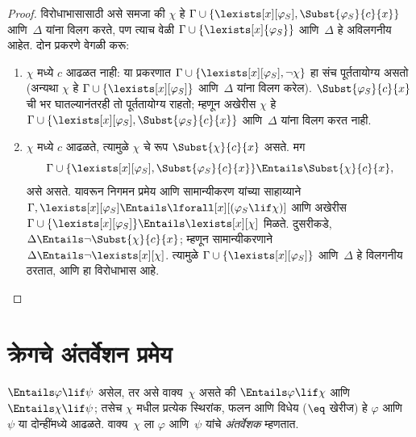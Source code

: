 \begin{proof}
विरोधाभासासाठी असे समजा की $\chi$ हे $\Gamma \cup \{ \lexists[x][\varphi_{S}],
\Subst{\varphi_{S}}{c}{x}\}$ आणि~$\Delta$ यांना विलग करते, पण त्याच वेळी
$\Gamma \cup \{\lexists[x]{\varphi_{S}} \}$ आणि~$\Delta$ हे अविलगनीय आहेत. दोन
प्रकरणे वेगळी करू:
\begin{enumerate}
\item $\chi$ मध्ये $c$ आढळत नाही: या प्रकरणात $\Gamma \cup
  \{\lexists[x][\varphi_{S}], \lnot\chi \}$ हा संच पूर्ततायोग्य असतो (अन्यथा
  $\chi$ हे $\Gamma \cup \{\lexists[x][\varphi_{S}] \}$ आणि~$\Delta$ यांना विलग
  करेल). $\Subst{\varphi_{S}}{c}{x}$ ची भर घातल्यानंतरही तो पूर्ततायोग्य राहतो;
  म्हणून अखेरीस $\chi$ हे $\Gamma \cup \{ \lexists[x][\varphi_{S}],
  \Subst{\varphi_{S}}{c}{x} \}$ आणि~$\Delta$ यांना विलग करत नाही.
\item $\chi$ मध्ये $c$ आढळते, त्यामुळे $\chi$ चे रूप
  $\Subst{\chi}{c}{x}$ असते. मग
  \[  \Gamma \cup \{ \lexists[x][\varphi_{S}], \Subst{\varphi_{S}}{c}{x}\} \Entails \Subst{\chi}{c}{x},
  \]
  असे असते. यावरून निगमन प्रमेय आणि सामान्यीकरण यांच्या साहाय्याने
  $\Gamma, \lexists[x][\varphi_{S}] \Entails \lforall[x][(\varphi_{S} \lif \chi)]$ आणि
  अखेरीस $\Gamma \cup \{ \lexists[x][\varphi_{S}] \} \Entails
  \lexists[x][\chi]$ मिळते. दुसरीकडे, $\Delta \Entails \lnot
  \Subst{\chi}{c}{x}$; म्हणून सामान्यीकरणाने $\Delta \Entails \lnot
  \lexists[x][\chi]$. त्यामुळे $\Gamma \cup \{\lexists[x][\varphi_{S}] \}$
  आणि~$\Delta$ हे विलगनीय ठरतात, आणि हा विरोधाभास आहे.
\end{enumerate}
\end{proof}












\section{क्रेगचे अंतर्वेशन प्रमेय}\label{mod:int:prf:sec}

\begin{thm}[क्रेगचे अंतर्वेशन प्रमेय]
\label{mod:int:prf:thm:interpol}
$\Entails \varphi \lif \psi$ असेल, तर असे वाक्य~$\chi$ असते की
$\Entails \varphi \lif \chi$ आणि $\Entails \chi \lif \psi$; तसेच $\chi$ मधील
प्रत्येक स्थिरांक, फलन आणि विधेय ($\eq$ खेरीज) हे
$\varphi$ आणि~$\psi$ या दोन्हींमध्ये आढळते. वाक्य~$\chi$ ला $\varphi$ आणि~$\psi$
यांचे \emph{अंतर्वेशक} म्हणतात.
\end{thm}

